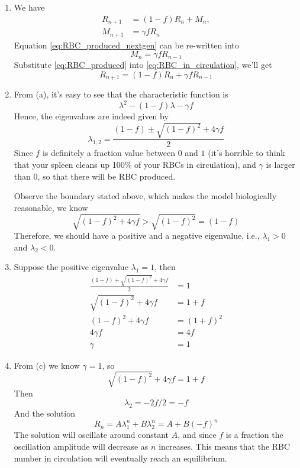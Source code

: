 \documentclass[
    classnum=MATH564,
    classname=MATHEMATICAL\ MODELING,
    due=January\ 28\,\ 2020,
    author=Gabrielle\ Streeter\qquad Hannah\ Wu\qquad\ Minghang\ Li,
    authorshort=Streeter\ \&\ Wu\ \&\ Li,
    teacher= Zachary\ M.\ Boyd,
    hw=1
]{hw-template}
\begin{document}
\begin{homeworkProblem}
\begin{enumerate}
\item We have \begin{align}
    R_{n+1} &= (1-f) R_n + M_n, \label{eq:RBC_in_circulation}\\
    M_{n+1} &= \gamma f R_n \label{eq:RBC_produced_nextgen}
\end{align}
Equation \eqref{eq:RBC_produced_nextgen} can be re-written into \begin{equation}
    M_{n} = \gamma f R_{n-1} \label{eq:RBC_produced}
\end{equation}
Substitute \eqref{eq:RBC_produced} into \eqref{eq:RBC_in_circulation}, we'll get
\[
    R_{n+1} = (1-f) R_n + \gamma f R_{n-1}
\]

\item From (a), it's easy to see that the characteristic function is \[
    \lambda^2 - (1-f) \lambda - \gamma f
\]
Hence, the eigenvalues are indeed given by \[
    \lambda_{1,2} = \frac{(1-f) \pm \sqrt{(1-f)^2} + 4\gamma f}{2}
\]
Since $f$ is definitely a fraction value between $0$ and $1$ (it's horrible to
think that your spleen cleans up 100\% of your RBCs in circulation), and $\gamma$
is larger than $0$, so that there will be RBC produced.

Observe the boundary stated above, which makes the model biologically reasonable,
we know \[
    \sqrt{(1-f)^2 + 4\gamma f} > \sqrt{(1-f)^2} = (1-f)
\]
Therefore, we should have a positive and a negative eigenvalue, i.e.,
$\lambda_1 > 0$ and $\lambda_2 < 0$.

\item Suppose the positive eigenvalue $\lambda_1 = 1$, then \[
    \begin{aligned}
    \frac{(1-f) + \sqrt{(1-f)^2} + 4\gamma f}{2} &= 1\\
    \sqrt{(1-f)^2} + 4\gamma f &= 1+f\\
    (1-f)^2 + 4\gamma f &= (1+f)^2\\
    4\gamma f &= 4f\\
    \gamma &= 1
    \end{aligned}
\]

\item From (c) we know $\gamma = 1$, so \[
    \sqrt{(1-f)^2} + 4\gamma f = 1+f
\]
Then \[
    \lambda_2 = -2f/2 = -f
    \]
And the solution \[
    R_n = A \lambda_1^n + B \lambda_2^n = A + B(-f)^n
\]
The solution will oscillate around constant $A$, and since $f$ is a fraction the
oscillation amplitude will decrease as $n$ increases. This means that the RBC
number in circulation will eventually reach an equilibrium.
\end{enumerate}
\end{homeworkProblem}
\end{document}
